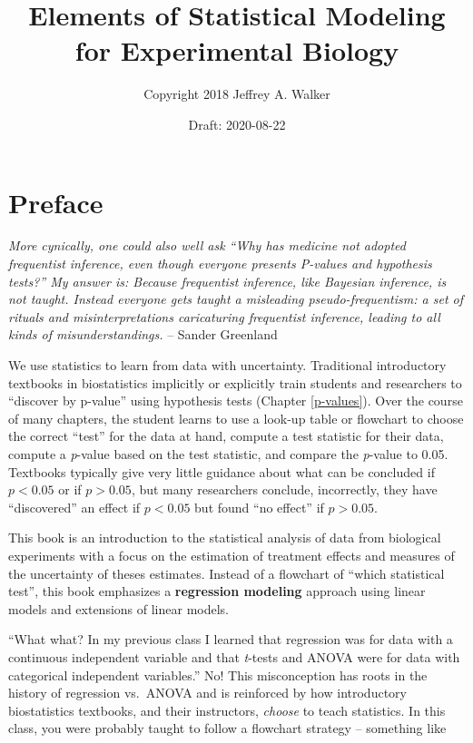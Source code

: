 \documentclass[]{book}
\title{Elements of Statistical Modeling for Experimental Biology}
\author{Copyright 2018 Jeffrey A. Walker}
\date{Draft: 2020-08-22}
\begin{document}
\maketitle

{
\setcounter{tocdepth}{1}
\tableofcontents
}
\hypertarget{preface}{%
\chapter*{Preface}\label{preface}}

\emph{More cynically, one could also well ask ``Why has medicine not adopted frequentist inference, even though everyone presents P-values and hypothesis tests?'' My answer is: Because frequentist inference, like Bayesian inference, is not taught. Instead everyone gets taught a misleading pseudo-frequentism: a set of rituals and misinterpretations caricaturing frequentist inference, leading to all kinds of misunderstandings.} -- Sander Greenland

We use statistics to learn from data with uncertainty. Traditional introductory textbooks in biostatistics implicitly or explicitly train students and researchers to ``discover by p-value'' using hypothesis tests (Chapter \ref{p-values}). Over the course of many chapters, the student learns to use a look-up table or flowchart to choose the correct ``test'' for the data at hand, compute a test statistic for their data, compute a \emph{p}-value based on the test statistic, and compare the \emph{p}-value to 0.05. Textbooks typically give very little guidance about what can be concluded if \(p < 0.05\) or if \(p > 0.05\), but many researchers conclude, incorrectly, they have ``discovered'' an effect if \(p < 0.05\) but found ``no effect'' if \(p > 0.05\).

This book is an introduction to the statistical analysis of data from biological experiments with a focus on the estimation of treatment effects and measures of the uncertainty of theses estimates. Instead of a flowchart of ``which statistical test'', this book emphasizes a \textbf{regression modeling} approach using linear models and extensions of linear models.

``What what? In my previous class I learned that regression was for data with a continuous independent variable and that \emph{t}-tests and ANOVA were for data with categorical independent variables.'' No! This misconception has roots in the history of regression vs.~ANOVA and is reinforced by how introductory biostatistics textbooks, and their instructors, \emph{choose} to teach statistics. In this class, you were probably taught to follow a flowchart strategy -- something like
\end{document}
